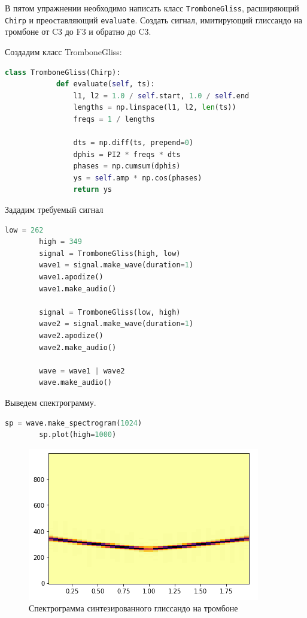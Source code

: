 \documentclass[a4paper, 14pt]{extarticle}
\begin{document}
    В пятом упражнении необходимо написать класс \texttt{TromboneGliss}, расширяющий \texttt{Chirp} и преоставляющий \texttt{evaluate}.
    Создать сигнал, имитирующий глиссандо на тромбоне от C3 до F3 и обратно до C3.

    Создадим класс TromboneGliss:

    \begin{lstlisting}[language=Python, caption= Класс TromboneGliss, label={lst:trombone_gliss}]
        class TromboneGliss(Chirp):
            def evaluate(self, ts):
                l1, l2 = 1.0 / self.start, 1.0 / self.end
                lengths = np.linspace(l1, l2, len(ts))
                freqs = 1 / lengths

                dts = np.diff(ts, prepend=0)
                dphis = PI2 * freqs * dts
                phases = np.cumsum(dphis)
                ys = self.amp * np.cos(phases)
                return ys
    \end{lstlisting}

    Зададим требуемый сигнал

    \begin{lstlisting}[language=Python, caption={Создание сигнала, имитирующего глиссандо}, label={lst:make_signal_trombone_gliss}]
        low = 262
        high = 349
        signal = TromboneGliss(high, low)
        wave1 = signal.make_wave(duration=1)
        wave1.apodize()
        wave1.make_audio()

        signal = TromboneGliss(low, high)
        wave2 = signal.make_wave(duration=1)
        wave2.apodize()
        wave2.make_audio()

        wave = wave1 | wave2
        wave.make_audio()
    \end{lstlisting}

    Выведем спектрограмму.

    \begin{lstlisting}[language=Python, caption= Вывод спектрограммы сигнала, label={lst:plot_spectrogram}]
        sp = wave.make_spectrogram(1024)
        sp.plot(high=1000)
    \end{lstlisting}

    \begin{figure}[H]
        \centering
        \includegraphics[width=0.8\linewidth]{trombone_gliss_spectrogram}
        \caption{Спектрограмма синтезированного глиссандо на тромбоне}
        \label{fig:trombone_gliss_spectrogram}
    \end{figure}
\end{document}
